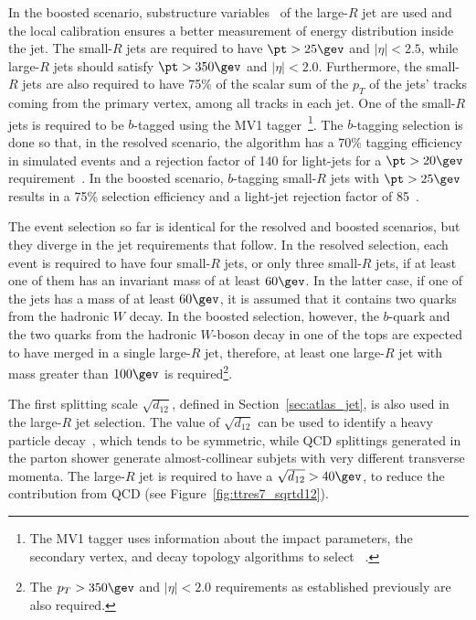In the boosted scenario, substructure
variables~\cite{fatjet_confnote} of the large-$R$ jet are used and the local calibration ensures a better measurement of energy distribution inside the jet.
The small-$R$ jets are required to have $\pt > 25\gev$ and $|\eta| < 2.5$, while large-$R$ jets should satisfy $\pt > 350\gev$ and $|\eta| < 2.0$.
Furthermore, the small-$R$ jets are also required to have 75\% of the scalar sum of the $p_T$ of the jets' tracks coming from the primary vertex,
among all tracks in each jet.
One of the small-$R$ jets is required to be $b$-tagged using the MV1 tagger~\footnote{The MV1 tagger uses information about the impact parameters, the secondary vertex, and decay topology
algorithms to select \bjets~\cite{mv1note}.}.
The $b$-tagging selection is done so that, in the resolved scenario, the
algorithm has a 70\% \bjet tagging efficiency in simulated \ttbar events and
a rejection factor of 140 for light-jets for a
$\pt > 20\gev$ requirement~\cite{ttres7paper}.
In the boosted scenario, $b$-tagging small-$R$ jets with $\pt > 25\gev$ results in a 75\% \bjet selection efficiency and a
light-jet rejection factor of 85~\cite{ttres7paper}.

The event selection so far is identical for the resolved and boosted scenarios, but they diverge in the jet requirements that follow.
In the resolved selection, each event is required to have four small-$R$ jets, or only three small-$R$ jets, if at least one of them has an invariant mass of at least
$60\gev$. In the latter case, if one of the jets has a mass of at least $60\gev$, it is assumed that it contains two quarks from the hadronic $W$ decay.
In the boosted selection, however, the $b$-quark and the two quarks from the hadronic $W$-boson decay in one of the tops are expected to have merged in a single
large-$R$ jet, therefore, at least one large-$R$ jet with mass greater than $100\gev$ is required\footnote{The
$p_T > 350\gev$ and $|\eta| < 2.0$ requirements as established previously are also required.}.

The first splitting scale $\sqrt{d_{12}}$, defined in Section~\ref{sec:atlas_jet}, is also used in the large-$R$ jet selection.
The value of $\sqrt{d_{12}}$ can be used to identify a heavy particle decay~\cite{ttres7paper},
which tends to be symmetric, while QCD splittings generated in the parton
shower generate almost-collinear subjets with very different transverse momenta.
The large-$R$ jet is required to have a $\sqrt{d_{12}} > 40 \gev$, to reduce the contribution
from QCD (see Figure~\ref{fig:ttres7_sqrtd12}). %

